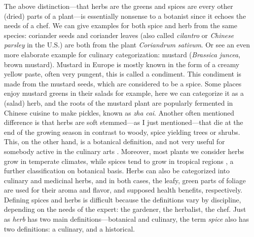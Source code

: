 The above distinction---that herbs are the greens and spices are every other (dried) parts of a plant---is essentially nonsense to a botanist since it echoes the needs of a chef. We can give examples for both spice and herb from the same species: coriander seeds and coriander leaves (also called \textit{cilantro} or \textit{Chinese parsley} in the U.S.) are both from the plant \textit{Coriandrum sativum}.
Or see an even more elaborate example for culinary categorization: mustard (\textit{Brassica juncea}, brown mustard). Mustard in Europe is mostly known in the form of a creamy yellow paste, often very pungent, this is called a condiment. This condiment is made from the mustard seeds, which are considered to be a spice. Some places enjoy mustard greens in their salads for example, here we can categorize it as a (salad) herb, and the roots of the mustard plant are popularly fermented in Chinese cuisine to make pickles, known as  \textit{zha cai}. Another often mentioned difference is that herbs are soft stemmed---as I just mentioned---that die at the end of the growing season in contrast to woody, spice yielding trees or shrubs. This, on the other hand, is a botanical definition, and not very useful for somebody active in the culinary arts \autocite[10]{allen_herbs_2012}. Moreover, most plants we consider herbs grow in temperate climates, while spices tend to grow in tropical regions \autocite{turner_spice_2004}, a further classification on botanical basis. Herbs can also be categorized into culinary and medicinal herbs, and in both cases, the leafy, green parts of foliage are used for their aroma and flavor, and supposed health benefits, respectively.
Defining spices and herbs is difficult because the definitions vary by discipline, depending on the needs of the expert: the gardener, the herbalist, the chef. Just as \textit{herb} has two main definitions---botanical and culinary, the term \textit{spice} also has two definitions: a culinary, and a historical.

